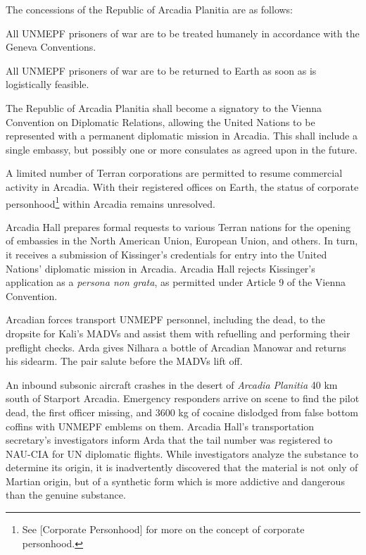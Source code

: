 The concessions of the Republic of Arcadia Planitia are as follows:
\startitemize[n]
\item All UNMEPF prisoners of war are to be treated humanely in accordance with the Geneva Conventions.
\item All UNMEPF prisoners of war are to be returned to Earth as soon as is logistically feasible.
\item The Republic of Arcadia Planitia shall become a signatory to the Vienna Convention on Diplomatic Relations, allowing the United Nations to be represented with a permanent diplomatic mission in Arcadia. This shall include a single embassy, but possibly one or more consulates as agreed upon in the future.
\item A limited number of Terran corporations are permitted to resume commercial activity in Arcadia. With their registered offices on Earth, the status of corporate personhood\footnote{See [Corporate Personhood] for more on the concept of corporate personhood.} within Arcadia remains unresolved.
\stopitemize

Arcadia Hall prepares formal requests to various Terran nations for the opening of embassies in the North American Union, European Union, and others. In turn, it receives a submission of Kissinger's credentials for entry into the United Nations' diplomatic mission in Arcadia. Arcadia Hall rejects Kissinger's application as a {\it persona non grata}, as permitted under Article 9 of the Vienna Convention.
\StopTimelineDate

Arcadian forces transport UNMEPF personnel, including the dead, to the dropsite for Kali's MADVs and assist them with refuelling and performing their preflight checks. Arda gives Nilhara a bottle of Arcadian Manowar and returns his sidearm. The pair salute before the MADVs lift off.
\StopTimelineDate

An inbound subsonic aircraft crashes in the desert of {\it Arcadia Planitia} 40 km south of Starport Arcadia. Emergency responders arrive on scene to find the pilot dead, the first officer missing, and 3600 kg of cocaine dislodged from false bottom coffins with UNMEPF emblems on them. Arcadia Hall's transportation secretary's investigators inform Arda that the tail number was registered to NAU-CIA for UN diplomatic flights. While investigators analyze the substance to determine its origin, it is inadvertently discovered that the material is not only of Martian origin, but of a synthetic form which is more addictive and dangerous than the genuine substance.
\StopTimelineDate

